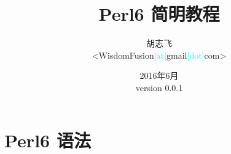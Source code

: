 \documentclass[12pt,a4paper]{ctexart}
\begin{document}
\title{\textbf{Perl6 简明教程}}
\author{胡志飞\\<WisdomFusion\textcolor{cyan}{\small [at]}gmail\textcolor{cyan}{\small [dot]}com>}
\date{\color{OrangeRed}2016年6月\\version 0.0.1}

\maketitle{}
\thispagestyle{empty}
\clearpage{}

\tableofcontents

\clearpage{}

\setcounter{page}{1}

\section{Perl6 语法}
\label{sec:perl6-syntax}
\end{document}
